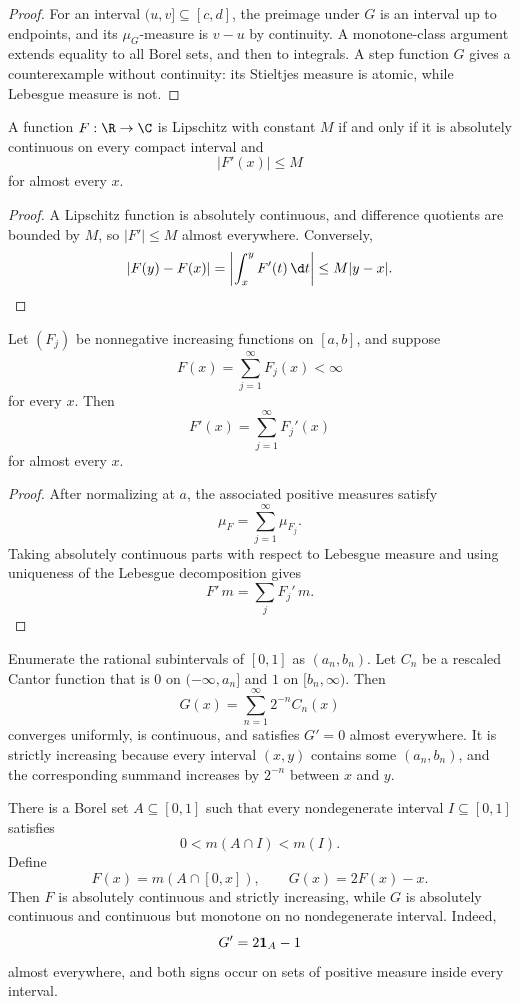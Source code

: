 \begin{proof}
For an interval $(u,v]\subseteq[c,d]$, the preimage under $G$ is an interval up to endpoints, and its $\mu_G$-measure is $v-u$ by continuity. A monotone-class argument extends equality to all Borel sets, and then to integrals. A step function $G$ gives a counterexample without continuity: its Stieltjes measure is atomic, while Lebesgue measure is not.
\end{proof}

\begin{prop}
A function $F:\R\to\C$ is Lipschitz with constant $M$ if and only if it is absolutely continuous on every compact interval and
\[
|F'(x)|\leq M
\]
for almost every $x$.
\end{prop}

\begin{proof}
A Lipschitz function is absolutely continuous, and difference quotients are bounded by $M$, so $|F'|\leq M$ almost everywhere. Conversely,
\[
|F(y)-F(x)|=\left|\int_x^yF'(t)\,\d t\right|
\leq M|y-x|.
\]
\end{proof}

\begin{prop}
Let $(F_j)$ be nonnegative increasing functions on $[a,b]$, and suppose
\[
F(x)=\sum_{j=1}^{\infty}F_j(x)<\infty
\]
for every $x$. Then
\[
F'(x)=\sum_{j=1}^{\infty}F_j'(x)
\]
for almost every $x$.
\end{prop}

\begin{proof}
After normalizing at $a$, the associated positive measures satisfy
\[
\mu_F=\sum_{j=1}^{\infty}\mu_{F_j}.
\]
Taking absolutely continuous parts with respect to Lebesgue measure and using uniqueness of the Lebesgue decomposition gives
\[
F'\,m=\sum_jF_j'\,m.
\]
\end{proof}

\begin{eg}
Enumerate the rational subintervals of $[0,1]$ as $(a_n,b_n)$. Let $C_n$ be a rescaled Cantor function that is $0$ on $(-\infty,a_n]$ and $1$ on $[b_n,\infty)$. Then
\[
G(x)=\sum_{n=1}^{\infty}2^{-n}C_n(x)
\]
converges uniformly, is continuous, and satisfies $G'=0$ almost everywhere. It is strictly increasing because every interval $(x,y)$ contains some $(a_n,b_n)$, and the corresponding summand increases by $2^{-n}$ between $x$ and $y$.
\end{eg}

\begin{eg}
There is a Borel set $A\subseteq[0,1]$ such that every nondegenerate interval $I\subseteq[0,1]$ satisfies
\[
0<m(A\cap I)<m(I).
\]
Define
\[
F(x)=m(A\cap[0,x]),
\qquad G(x)=2F(x)-x.
\]
Then $F$ is absolutely continuous and strictly increasing, while $G$ is absolutely continuous and continuous but monotone on no nondegenerate interval. Indeed,
\[
G'=2\mathbf{1}_A-1
\]
almost everywhere, and both signs occur on sets of positive measure inside every interval.
\end{eg}
